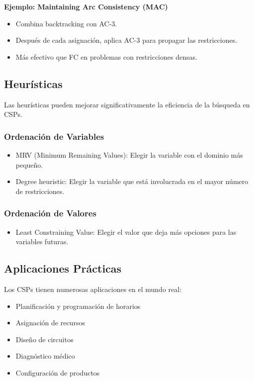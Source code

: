 \documentclass[12pt,a4paper]{report}
\begin{document}
\textbf{Ejemplo: Maintaining Arc Consistency (MAC)}
\begin{itemize}
    \item Combina backtracking con AC-3.
    \item Después de cada asignación, aplica AC-3 para propagar las restricciones.
    \item Más efectivo que FC en problemas con restricciones densas.
\end{itemize}

\subsection{Heurísticas}

Las heurísticas pueden mejorar significativamente la eficiencia de la búsqueda en CSPs.

\subsubsection{Ordenación de Variables}
\begin{itemize}
    \item MRV (Minimum Remaining Values): Elegir la variable con el dominio más pequeño.
    \item Degree heuristic: Elegir la variable que está involucrada en el mayor número de restricciones.
\end{itemize}

\subsubsection{Ordenación de Valores}
\begin{itemize}
    \item Least Constraining Value: Elegir el valor que deja más opciones para las variables futuras.
\end{itemize}

\subsection{Aplicaciones Prácticas}

Los CSPs tienen numerosas aplicaciones en el mundo real:

\begin{itemize}
    \item Planificación y programación de horarios
    \item Asignación de recursos
    \item Diseño de circuitos
    \item Diagnóstico médico
    \item Configuración de productos
\end{itemize}
\end{document}
